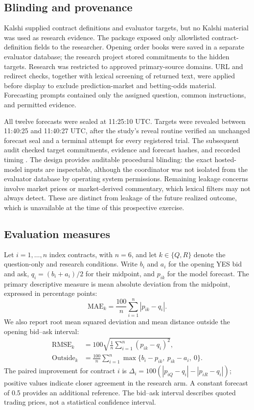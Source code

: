 \documentclass[11pt,letterpaper]{article}
\begin{document}
\subsection{Blinding and provenance}
\label{sec:blinding}
Kalshi supplied contract definitions and evaluator targets, but no Kalshi
material was used as research evidence. The package exposed only allowlisted
contract-definition fields to the researcher. Opening order books were saved
in a separate evaluator database; the research project stored commitments to
the hidden targets. Research was restricted to approved primary-source
domains. URL and redirect checks, together with lexical screening of returned
text, were applied before display to exclude prediction-market and
betting-odds material. Forecasting prompts contained only the assigned
question, common instructions, and permitted evidence.

All twelve forecasts were sealed at 11:25:10 UTC. Targets were revealed
between 11:40:25 and 11:40:27 UTC, after the study's reveal routine verified an
unchanged forecast seal and a terminal attempt for every registered trial.
The subsequent audit checked target commitments, evidence and forecast
hashes, and recorded timing \cite{audit}. The design provides auditable
procedural blinding: the exact hosted-model inputs are inspectable, although
the coordinator was not isolated from the evaluator database by operating
system permissions. Remaining leakage concerns involve market prices or
market-derived commentary, which lexical filters may not always detect.
These are distinct from leakage of the future realized outcome, which is
unavailable at the time of this prospective exercise.

\subsection{Evaluation measures}
Let $i=1,\ldots,n$ index contracts, with $n=6$, and let
$k\in\{Q,R\}$ denote the question-only and research conditions. Write $b_i$
and $a_i$ for the opening YES bid and ask, $q_i=(b_i+a_i)/2$ for their midpoint,
and $p_{ik}$ for the model forecast. The primary descriptive measure is mean
absolute deviation from the midpoint, expressed in percentage points:
\begin{equation}
 \mathrm{MAE}_k = \frac{100}{n}\sum_{i=1}^{n}|p_{ik}-q_i|.
 \label{eq:mae}
\end{equation}
We also report root mean squared deviation and mean distance outside the
opening bid--ask interval:
\begin{align}
 \mathrm{RMSE}_k &=100\sqrt{\frac{1}{n}\sum_{i=1}^{n}(p_{ik}-q_i)^2},\\
 \mathrm{Outside}_k &=\frac{100}{n}\sum_{i=1}^{n}
 \max\{b_i-p_{ik},\ p_{ik}-a_i,\ 0\}.
\end{align}
The paired improvement for contract $i$ is
$\Delta_i=100(|p_{iQ}-q_i|-|p_{iR}-q_i|)$; positive values indicate closer
agreement in the research arm. A constant forecast of 0.5 provides an
additional reference. The bid--ask interval describes quoted trading prices,
not a statistical confidence interval.
\end{document}
